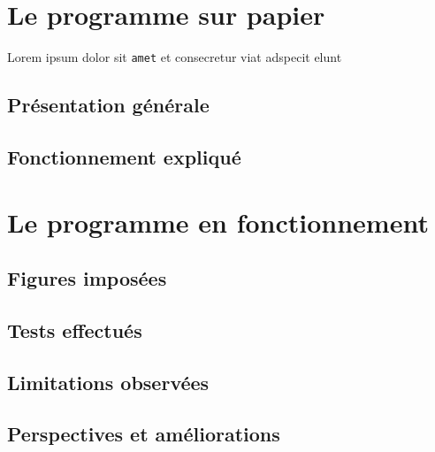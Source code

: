 \section{Le programme sur papier}
   Lorem ipsum dolor sit \texttt{amet} et consecretur viat adspecit elunt

   \subsection{Présentation générale}

   \subsection{Fonctionnement expliqué}
   

\section{Le programme en fonctionnement}

   \subsection{Figures imposées}

   \subsection{Tests effectués}
   
   \subsection{Limitations observées}
   
   \subsection{Perspectives et améliorations}
